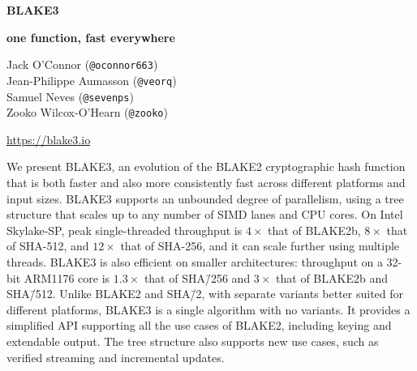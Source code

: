 \documentclass[11pt,notitlepage,a4paper]{article}
\title{\mytitle}
\newcommand{\mytitle}{BLAKE3}
\begin{document}
\selectfont
\pagestyle{plain}

{\let\thefootnote\relax{}}

\begin{center}
{\Huge \bf \mytitle}

\medskip

{\Large \bf  one function, fast everywhere}

\medskip

Jack O'Connor (\texttt{@oconnor663}) \\
Jean-Philippe Aumasson (\texttt{@veorq}) \\
Samuel Neves (\texttt{@sevenps}) \\
Zooko Wilcox-O'Hearn (\texttt{@zooko}) \\

\medskip

{\large \url{https://blake3.io}}

\end{center}


\medskip

\begin{center}
  \begin{minipage}{0.92\linewidth}

      We present BLAKE3, an evolution of the BLAKE2 cryptographic hash function
      that is both faster and also more consistently fast across different
      platforms and input sizes. BLAKE3 supports an unbounded degree of
      parallelism, using a tree structure that scales up to any number of SIMD
      lanes and CPU cores. On Intel Skylake-SP, peak single-threaded throughput
      is $4\times$ that of BLAKE2b, $8\times$ that of SHA-512, and $12\times$
      that of SHA-256, and it can scale further using multiple threads. BLAKE3
      is also efficient on smaller architectures: throughput on a 32-bit
      ARM1176 core is $1.3\times$ that of SHA\=/256 and $3\times$ that of
      BLAKE2b and SHA\=/512. Unlike BLAKE2 and SHA\=/2, with separate variants
      better suited for different platforms, BLAKE3 is a single algorithm with
      no variants. It provides a simplified API supporting all the use cases of
      BLAKE2, including keying and extendable output. The tree structure also
      supports new use cases, such as verified streaming and incremental
      updates.

   \end{minipage}
\end{center}

\newpage
\end{document}

